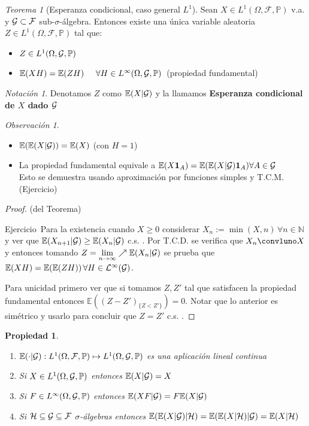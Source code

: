 \documentclass[letterpaper,11pt]{article} %
\def\espacio{\hspace{.25cm}\,}
\theoremstyle{defbreak}
\theoremstyle{propbreak}
\newtheorem{property}{Propiedad}[subsection]
\theoremstyle{remark}
\newtheorem{remark}{Observación}[subsection]
\newtheorem*{notation}{Notación}
\theoremstyle{break}
\newtheorem{theorem}{Teorema}[subsection]
\def\E{\mathbb{E}}
\def\P{\mathbb{P}}
\def\N{\mathbb{N}}
\def\edp{(\Omega,\mathcal{F},\mathbb{P})}
\def\ejercicio{\color{blue}Ejercicio\color{black}}
\def\beforeitemize{\leavevmode \vspace{-0.5\baselineskip}}
\def\gris{\color{mygray}}
\def\negro{\color{black}}
\begin{document}
\vspace{2cm}  %
\begin{theorem}[Esperanza condicional, caso general $L^1$]
Sean $X\in L^1\edp$ v.a. y $\mathcal{G}\subset\mathcal{F}$ sub-$\sigma$-álgebra. Entonces existe una única variable aleatoria $Z\in L^1\edp$ tal que:
\begin{itemize}
    \item $Z\in L^1(\Omega,\G,\P)$
    \item $\E(XH)=\E(ZH) \hspace{.5cm} \forall H\in L^\infty(\Omega,\G,\P)$ \espacio (propiedad fundamental)
\end{itemize}
\end{theorem}
\begin{notation}
Denotamos $Z$  como $\E(X|\G)$ y la llamamos \textbf{Esperanza condicional de $X$ %
dado $\mathcal{G}$}
\end{notation}
\begin{remark}
\beforeitemize
\begin{itemize}
    \item $\E(\E(X|\G))=\E(X)$ (con $H=1$)
    \item La propiedad fundamental equivale a $\E(X \mathbf{1}_A)=\E(\E(X|\G)\mathbf{1}_A) \forall A\in\G$
    \\ Esto se demuestra usando aproximación por funciones simples y T.C.M. (\ejercicio)
\end{itemize}
\end{remark}
\begin{proof}
(del Teorema)

\ejercicio \gris \, Para la existencia cuando $X\geq0$ considerar $X_n:=\min(X,n) \, \forall n\in\N$ y ver que $\E(X_{n+1}|\G)\geq\E(X_n|\G)$ c.s. . Por T.C.D. se verifica que $X_n\convluno X$ y entonces tomando $Z=\displaystyle\lim_{n\to\infty}\nearrow\E(X_n|\G)$ se prueba que $\E(XH)=\E(\E(ZH))\,\forall H\in \L^\infty(\G)$. 

Para unicidad primero ver que si tomamos $Z,Z'$ tal que satisfacen la propiedad fundamental entonces $\E((Z-Z')_{\{Z<Z'\}})=0$. Notar que lo anterior es simétrico y usarlo para concluir que $Z=Z'$ c.s. .
\negro
\end{proof}
\begin{property}
\beforeitemize
\begin{enumerate}
    \item[(i)] $\E(\cdot|\G):L^1\edp\mapsto L^1(\Omega,\G,\P)$ es una aplicación lineal continua
    \item[(ii)] Si $X\in L^1(\Omega,\G,\P)$ entonces $\E(X|\G)=X$
    \item[(iii)] Si $F\in L^\infty(\Omega,\G,\P)$ entonces $\E(XF|\G)=F\E(X|\G)$
    \item[(iv)] Si $\mathcal{H}\subseteq \mathcal{G}\subseteq\mathcal{F}$ $\sigma$-álgebras entonces
    $ \E(\E(X|\G)|\mathcal{H}) = \E(\E(X|\mathcal{H})|\G)=\E(X|\mathcal{H})$
\end{enumerate}
\end{property}
\end{document}
